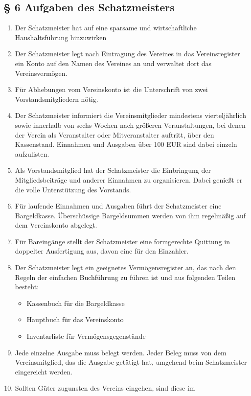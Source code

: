 \documentclass[10pt,a4paper]{article}
\begin{document}
\subsection*{§ 6 Aufgaben des Schatzmeisters}
\begin{enumerate}
\item Der Schatzmeister hat auf eine sparsame und wirtschaftliche
	Haushaltsführung hinzuwirken
\item Der Schatzmeister legt nach Eintragung des Vereines in das Vereinsregister
	ein Konto auf den Namen des Vereines an und verwaltet dort das
	Vereinsvermögen.
\item Für Abhebungen vom Vereinskonto ist die Unterschrift von zwei
	Vorstandsmitgliedern nötig.
\item Der Schatzmeister informiert die Vereinsmitglieder mindestens
	vierteljährlich sowie innerhalb von sechs Wochen nach größeren
	Veranstaltungen, bei denen der Verein als Veranstalter oder
	Mitveranstalter auftritt, über den Kassenstand. Einnahmen und
	Ausgaben über 100 EUR sind dabei einzeln aufzulisten.
\item Als Vorstandsmitglied hat der Schatzmeister die Einbringung der
	Mitgliedsbeiträge und anderer Einnahmen zu organisieren. Dabei
	genießt er die volle Unterstützung des Vorstands.
\item Für laufende Einnahmen und Ausgaben führt der Schatzmeister eine
	Bargeldkasse. Über\-schüs\-sige Bargeldsummen werden von ihm
	regelmäßig auf dem Vereinskonto abgelegt.
\item Für Bareingänge stellt der Schatzmeister eine formgerechte Quittung
	in doppelter Ausfertigung aus, davon eine für den Einzahler.
\item Der Schatzmeister legt ein geeignetes Vermögensregister an, das
	nach den Regeln der einfachen Buchführung zu führen ist und aus
	folgenden Teilen besteht:
	\begin{itemize}
	\item Kassenbuch für die Bargeldkasse
	\item Hauptbuch für das Vereinskonto
	\item Inventarliste für Vermögensgegenstände 
	\end{itemize}
\item Jede einzelne Ausgabe muss belegt werden. Jeder Beleg muss von
	dem Vereinsmitglied, das die Ausgabe getätigt hat, umgehend
	beim Schatzmeister eingereicht werden.
\item Sollten Güter zugunsten des Vereins eingehen, sind diese im

\end{enumerate}
\end{document}

